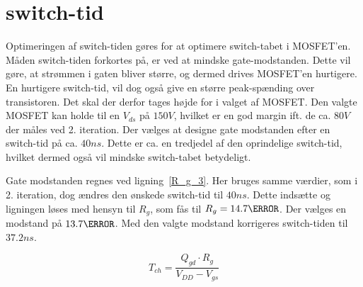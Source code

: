 
\section{switch-tid}
Optimeringen af switch-tiden gøres for at optimere switch-tabet i MOSFET'en. Måden switch-tiden forkortes på, er ved at mindske gate-modstanden. Dette vil gøre, at strømmen i gaten bliver større, og dermed drives MOSFET'en hurtigere. En hurtigere switch-tid, vil dog også give en større peak-spænding over transistoren. Det skal der derfor tages højde for i valget af MOSFET. Den valgte MOSFET kan holde til en $V_{ds}$ på $150V$, hvilket er en god margin ift. de ca. $80V$ der måles ved 2. iteration. Der vælges at designe gate modstanden efter en switch-tid på ca. $40ns$. Dette er ca. en tredjedel af den oprindelige switch-tid, hvilket dermed også vil mindske switch-tabet betydeligt. 

Gate modstanden regnes ved ligning~\ref{R_g_3}\cite{gate_res}. Her bruges samme værdier, som i 2. iteration, dog ændres den ønskede switch-tid til $40ns$. Dette indsætte og ligningen løses med hensyn til $R_{g}$, som fås til $R_{g}=14.7\ohm$. Der vælges en modstand på $13.7\ohm$. Med den valgte modstand korrigeres switch-tiden til $37.2ns$.

\begin{equation} \label{R_g_3}
T_{ch} = \frac{Q_{gd} \cdot R_{g}}{V_{DD}-V_{gs}}
\end{equation}

 